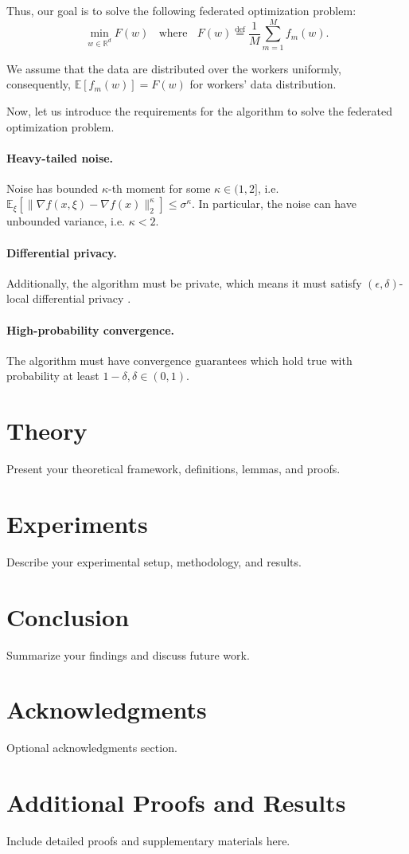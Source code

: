 \documentclass{article}
\newcommand{\EE}{\mathbb{E}}
\newcommand{\R}{\mathbb{R}}
\begin{document}
Thus, our goal is to solve the following federated optimization problem:
\begin{equation}
\min_{w\in \R^d}F(w)~~~~ \text{where}~~~~ F(w) \overset{\mathrm{def}}{=} \frac{1}{M}\sum_{m=1}^{M}f_{m}(w).
\end{equation}

We assume that the data are distributed over the workers uniformly, consequently, $\EE[f_{m}(w)]=F(w)$ for workers' data distribution.

Now, let us introduce the requirements for the algorithm to solve the federated optimization problem.
\paragraph{Heavy-tailed noise.}
Noise has bounded $\kappa$-th moment for some $\kappa \in (1,2]$, i.e. $\EE_\xi[\| \nabla f (x, \xi) - \nabla f(x)\|_2^\kappa] \leq \sigma^\kappa$. In particular, the noise can have unbounded variance, i.e. $\kappa < 2$.

\paragraph{Differential privacy.}
Additionally, the algorithm must be private, which means it must satisfy $(\epsilon,\delta)$-local differential privacy \cite{Dwork2014}.

\paragraph{High-probability convergence.}
The algorithm must have convergence guarantees which hold true with probability at least $1 - \delta, \delta \in (0,1)$.

\section{Theory}
Present your theoretical framework, definitions, lemmas, and proofs.

\section{Experiments}
Describe your experimental setup, methodology, and results.

\section{Conclusion}
Summarize your findings and discuss future work.

\section{Acknowledgments}
Optional acknowledgments section.

\appendix
\section{Additional Proofs and Results}
Include detailed proofs and supplementary materials here.

\printbibliography
\end{document}
